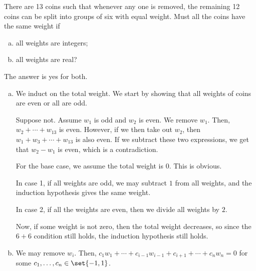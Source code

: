 \documentclass[10pt]{mypackage}
\begin{document}
\begin{problem}
There are 13 coins such that whenever any one is removed, the remaining 12 coins can be split into groups of six with equal weight. Must all the coins have the same weight if
\begin{enumerate}[(a)]
  \item all weights are integers;
  \item all weights are real?
\end{enumerate}
\end{problem}
\begin{solution}
  The answer is yes for both.
  \begin{enumerate}[(a)]
    \item We induct on the total weight. We start by showing that all weights of coins are even or all are odd.\newline

      Suppose not. Assume $w_1$ is odd and $w_2$ is even. We remove $w_1$. Then, $w_2 + \cdots + w_{13}$ is even. However, if we then take out $w_2$, then $w_1 + w_3 + \cdots + w_{13}$ is also even. If we subtract these two expressions, we get that $w_2 - w_1$ is even, which is a contradiction.\newline

      For the base case, we assume the total weight is $0$. This is obvious.\newline

      In case 1, if all weights are odd, we may subtract $1$ from all weights, and the induction hypothesis gives the same weight.\newline

      In case 2, if all the weights are even, then we divide all weights by $2$.\newline

      Now, if some weight is not zero, then the total weight decreases, so since the $6+6$ condition still holds, the induction hypothesis still holds.
    \item We may remove $w_i$. Then, $c_1w_{1} + \cdots + c_{i-1}w_{i-1}+ c_{i+1} + \cdots + c_{n}w_n = 0$ for some $c_1,\dots,c_n\in \set{-1,1}$.\newline


\end{enumerate}
\end{solution}
\end{document}
